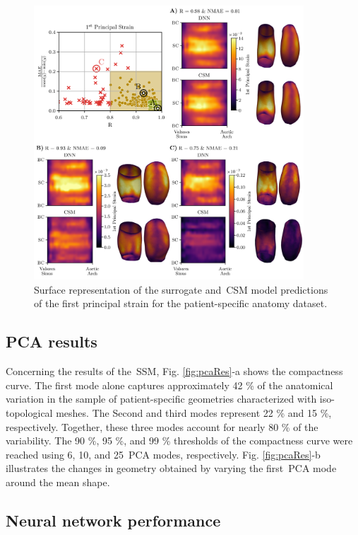 \documentclass[a4paper,fleqn]{cas-sc}
\begin{document}
\begin{figure}
  \centering
  \includegraphics[width=0.9\textwidth]{fig7}
  \caption{Surface representation of the surrogate and~\gls{CSM} model predictions of the first principal strain for the patient-specific anatomy dataset.}
  \label{fig:surface_representationPSStrain}
\end{figure}

\subsection{PCA results}
  Concerning the results of the~\gls{SSM}, Fig. \ref{fig:pcaRes}-a shows the compactness curve. The first mode alone captures approximately 42 \% of the anatomical variation in the sample of patient-specific geometries characterized with iso-topological meshes. The Second and third modes represent 22 \% and 15 \%, respectively. Together, these three modes account for nearly 80 \% of the variability. The 90 \%, 95 \%, and 99 \% thresholds of the compactness curve were reached using 6, 10, and 25~\gls{PCA} modes, respectively. Fig. \ref{fig:pcaRes}-b illustrates the changes in geometry obtained by varying the first~\gls{PCA} mode around the mean shape.

\subsection{Neural network performance} 
\end{document}
